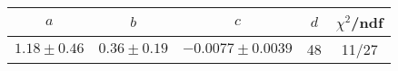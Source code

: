 \begin{tabular}{c|c|c|c|c}
$a$ & $b$ & $c$ & $d$ & $\chi^2$/ndf \\
\hline
$1.18\pm0.46$ & $0.36\pm0.19$ & $-0.0077\pm0.0039$ & 48 & 11/27
\end{tabular}
